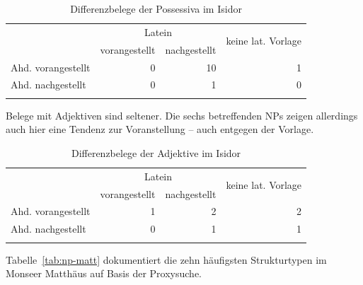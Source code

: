 \begin{table}
\centering
\begin{tabular}{lrrr}
\lsptoprule
                   & \multicolumn{2}{c}{Latein} & \multirow{2}{*}{keine lat. Vorlage}\\
 \cmidrule(lr){2-3}
                   & vorangestellt & nachgestellt & \\ \midrule
Ahd. vorangestellt & 0                  & 10                 & 1                    \\
Ahd. nachgestellt  & 0                  & 1                 & 0                    \\ \lspbottomrule
\end{tabular}
\caption{Differenzbelege  der Possessiva  im Isidor}
\label{tab:diff-poss-isidor}
\end{table}

Belege mit Adjektiven  sind seltener. Die sechs betreffenden NPs zeigen allerdings auch hier eine Tendenz zur Voranstellung -- auch entgegen der Vorlage. 

\begin{table}
\centering
\begin{tabular}{lrrr}
\lsptoprule
                   & \multicolumn{2}{c}{Latein} & \multirow{2}{*}{keine lat. Vorlage}\\
 \cmidrule(lr){2-3}
                   & vorangestellt & nachgestellt & \\ \midrule
Ahd. vorangestellt & 1                  & 2                 & 2                    \\
Ahd. nachgestellt  & 0                  & 1                 & 1                    \\ \lspbottomrule
\end{tabular}
\caption{Differenzbelege  der Adjektive  im Isidor}
\label{tab:diff-adj.-isidor}
\end{table}


Tabelle~\ref{tab:np-matt} dokumentiert die zehn häufigsten Strukturtypen im Monseer Matthäus auf Basis der  Proxysuche. 

